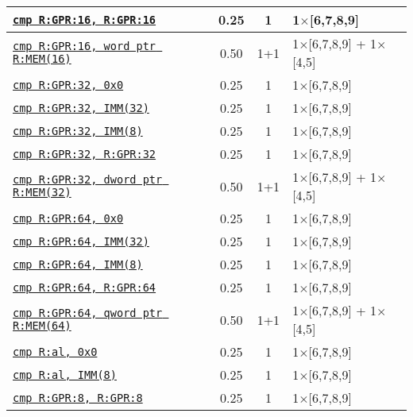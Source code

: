 \documentclass[a4paper,english,fontsize=9]{scrartcl}
\begin{document}
\begin{longtable}{p{}ccL{.25\textwidth}}
  \midrule
  \texttt{\href{https://felixcloutier.com/x86/CMP.html}{cmp R:GPR:16, R:GPR:16}} & 0.25 & 1 & 1\(\times\)[6,7,8,9] \\
  \midrule
  \texttt{\href{https://felixcloutier.com/x86/CMP.html}{cmp R:GPR:16, word ptr R:MEM(16)}} & 0.50 & 1+1 & 1\(\times\)[6,7,8,9] + 1\(\times\)[4,5] \\
  \midrule
  \texttt{\href{https://felixcloutier.com/x86/CMP.html}{cmp R:GPR:32, 0x0}} & 0.25 & 1 & 1\(\times\)[6,7,8,9] \\
  \midrule
  \texttt{\href{https://felixcloutier.com/x86/CMP.html}{cmp R:GPR:32, IMM(32)}} & 0.25 & 1 & 1\(\times\)[6,7,8,9] \\
  \midrule
  \texttt{\href{https://felixcloutier.com/x86/CMP.html}{cmp R:GPR:32, IMM(8)}} & 0.25 & 1 & 1\(\times\)[6,7,8,9] \\
  \midrule
  \texttt{\href{https://felixcloutier.com/x86/CMP.html}{cmp R:GPR:32, R:GPR:32}} & 0.25 & 1 & 1\(\times\)[6,7,8,9] \\
  \midrule
  \texttt{\href{https://felixcloutier.com/x86/CMP.html}{cmp R:GPR:32, dword ptr R:MEM(32)}} & 0.50 & 1+1 & 1\(\times\)[6,7,8,9] + 1\(\times\)[4,5] \\
  \midrule
  \texttt{\href{https://felixcloutier.com/x86/CMP.html}{cmp R:GPR:64, 0x0}} & 0.25 & 1 & 1\(\times\)[6,7,8,9] \\
  \midrule
  \texttt{\href{https://felixcloutier.com/x86/CMP.html}{cmp R:GPR:64, IMM(32)}} & 0.25 & 1 & 1\(\times\)[6,7,8,9] \\
  \midrule
  \texttt{\href{https://felixcloutier.com/x86/CMP.html}{cmp R:GPR:64, IMM(8)}} & 0.25 & 1 & 1\(\times\)[6,7,8,9] \\
  \midrule
  \texttt{\href{https://felixcloutier.com/x86/CMP.html}{cmp R:GPR:64, R:GPR:64}} & 0.25 & 1 & 1\(\times\)[6,7,8,9] \\
  \midrule
  \texttt{\href{https://felixcloutier.com/x86/CMP.html}{cmp R:GPR:64, qword ptr R:MEM(64)}} & 0.50 & 1+1 & 1\(\times\)[6,7,8,9] + 1\(\times\)[4,5] \\
  \midrule
  \texttt{\href{https://felixcloutier.com/x86/CMP.html}{cmp R:al, 0x0}} & 0.25 & 1 & 1\(\times\)[6,7,8,9] \\
  \midrule
  \texttt{\href{https://felixcloutier.com/x86/CMP.html}{cmp R:al, IMM(8)}} & 0.25 & 1 & 1\(\times\)[6,7,8,9] \\
  \midrule
  \texttt{\href{https://felixcloutier.com/x86/CMP.html}{cmp R:GPR:8, R:GPR:8}} & 0.25 & 1 & 1\(\times\)[6,7,8,9] \\
  \midrule

\end{longtable}
\end{document}
